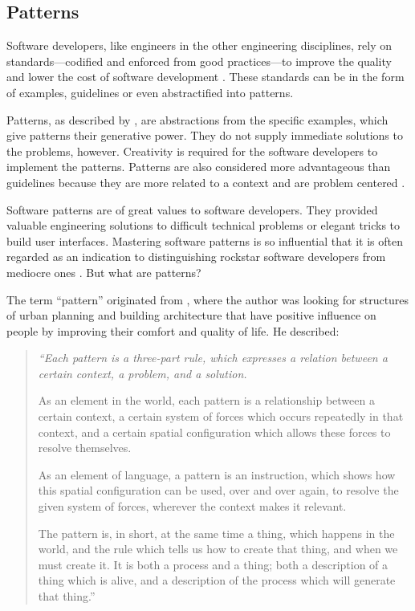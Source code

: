 \documentclass[a4paper,titlepage]{article}
\begin{document}
\subsection{Patterns}
\label{sec:patterns}
Software developers, like engineers in the other engineering
disciplines, rely on standards---codified and enforced from good
practices---to improve the quality and lower the cost of software
development \citep{practice:ipenz}. These standards can be in the form
of examples, guidelines or even abstractified into patterns.

Patterns, as described by \citet{patterns:griffiths}, are abstractions
from the specific examples, which give patterns their generative
power. They do not supply immediate solutions to the problems,
however. Creativity is required for the software developers to
implement the patterns. Patterns are also considered more advantageous
than guidelines because they are more related to a context and are
problem centered \citep{patterns:welie}.

Software patterns are of great values to software developers. They
provided valuable engineering solutions to difficult technical
problems or elegant tricks to build user interfaces. Mastering
software patterns is so influential that it is often regarded as an
indication to distinguishing rockstar software developers from
mediocre ones \citep{rockstar:iskold}. But what are patterns?

The term ``pattern'' originated from \citet{timeless:alexander}, where
the author was looking for structures of urban planning and building
architecture that have positive influence on people by improving their
comfort and quality of life. He described:
\begin{quote}
  {\it ``Each pattern is a three-part rule, which expresses a relation
    between a certain context, a problem, and a solution.

    As an element in the world, each pattern is a relationship between
    a certain context, a certain system of forces which occurs
    repeatedly in that context, and a certain spatial configuration
    which allows these forces to resolve themselves.

    As an element of language, a pattern is an instruction, which
    shows how this spatial configuration can be used, over and over
    again, to resolve the given system of forces, wherever the context
    makes it relevant.

    The pattern is, in short, at the same time a thing, which happens
    in the world, and the rule which tells us how to create that
    thing, and when we must create it. It is both a process and a
    thing; both a description of a thing which is alive, and a
    description of the process which will generate that thing.''}

  \raggedleft \citep[p.~247]{timeless:alexander}
\end{quote}
\end{document}
